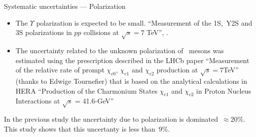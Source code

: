 \begin{frame}{Systematic uncertainties --- Polarization}


\begin{itemize}
\item The $\Upsilon$ polarization is expected to be small. 
``Measurement of the \Y1S,\ Y2S and \Y3S polarizations in  $pp$ collisions at $\sqrt{s}=7$ TeV'', .
\item The uncertainty related to the unknown polarization of \chib~mesons was estimated using
the prescription described in the LHCb paper ``Measurement of the relative rate of prompt $\chi_{c0}$, $\chi_{c1}$ and $\chi_{c2}$ production at $\sqrt{s}=7$TeV'' (thanks to Edwige Tournefier) that is based on the analytical calculations in HERA
``Production of the Charmonium States $\chi_{c1}$ and $\chi_{c2}$ in Proton Nucleus Interactions at $\sqrt{s}$ = 41.6-GeV''
\end{itemize}

\begin{block}{}
In the previous study the uncertainty due to polarization is dominated~$\approx 20\%$. This study shows that this uncertanty is less than~$9\%$.
\end{block}
\end{frame}
